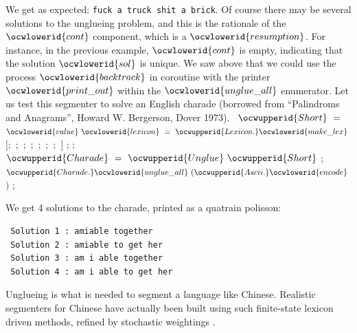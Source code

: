 \documentclass[12pt]{article}
\begin{document}
\ocwendcode{}\ocwindent{0.00em}
We get as expected: \verb:fuck a truck shit a brick:.                  
\ocweol
\ocwindent{0.00em}
Of course there may be several solutions to the unglueing problem, 
and this is the rationale of the \ocwbegindcode{}$\ocwlowerid{cont}$\ocwenddcode{} component, which is a \ocwbegindcode{}$\ocwlowerid{resumption}$\ocwenddcode{}. 
For instance, in the previous example, \ocwbegindcode{}$\ocwlowerid{cont}$\ocwenddcode{} is empty, indicating
that the solution \ocwbegindcode{}$\ocwlowerid{sol}$\ocwenddcode{} is unique.                                        
\ocweol
\ocwindent{0.00em}
We saw above that we could use the process \ocwbegindcode{}$\ocwlowerid{backtrack}$\ocwenddcode{} in coroutine with
the printer \ocwbegindcode{}$\ocwlowerid{print\_out}$\ocwenddcode{} within the \ocwbegindcode{}$\ocwlowerid{unglue\_all}$\ocwenddcode{} enumerator.               
\ocweol
\ocwindent{0.00em}
Let us test this segmenter to solve an English charade (borrowed from
``Palindroms and Anagrams'', Howard W. Bergerson, Dover 1973).            
\ocweol
\label{../ML/unglue_test.ml:3017}%
\medskip
\ocwbegincode{}\ocwindent{0.00em}
~$\ocwupperid{Short}~=~$\ocweol
\ocwindent{1.00em}
$\ocwlowerid{value}~\ocwlowerid{lexicon}~=~\ocwupperid{Lexicon.}\ocwlowerid{make\_lex}~$\ocweol
\ocwindent{2.00em}
$[$;~;~;~;~;~;~;~$]$\ocweol
\ocwindent{1.00em}
;\ocweol
\ocwindent{1.00em}
\ocweol
\ocwindent{0.00em}
;\ocweol
\ocwindent{0.00em}
~$\ocwupperid{Charade}~=~\ocwupperid{Unglue}~\ocwupperid{Short}$\ocweol
\ocwindent{0.00em}
;\ocweol
\ocwindent{0.00em}
$\ocwupperid{Charade.}\ocwlowerid{unglue\_all}~(\ocwupperid{Ascii.}\ocwlowerid{encode}~$$)$\ocweol
\ocwindent{0.00em}
;\medskip

\ocwendcode{}\ocwindent{0.00em}
We get 4 solutions to the charade, printed as a quatrain polisson:
\begin{verbatim}
 Solution 1 : amiable together
 Solution 2 : amiable to get her
 Solution 3 : am i able together
 Solution 4 : am i able to get her 
\end{verbatim}

\ocweol
\ocwindent{0.00em}
Unglueing is what is needed to segment a language like Chinese. Realistic
segmenters for Chinese have actually been built using such finite-state 
lexicon driven methods, refined by stochastic weightings \cite{sproat}.
\end{document}
